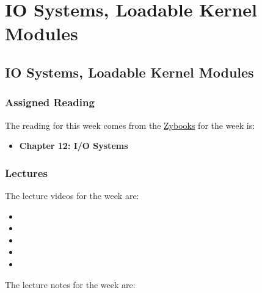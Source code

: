 \clearpage

\renewcommand{\ChapTitle}{IO Systems, Loadable Kernel Modules}
\renewcommand{\SectionTitle}{IO Systems, Loadable Kernel Modules}

\chapter{\ChapTitle}
\section{\SectionTitle}

\subsection{Assigned Reading}

The reading for this week comes from the \href{https://learn.zybooks.com/zybook/COLORADOCSPB3753KnoxFall2024}{Zybooks} for the week is:

\begin{itemize}
    \item \textbf{Chapter 12: I/O Systems}
\end{itemize}

\subsection{Lectures}

The lecture videos for the week are:

\begin{itemize}
    \item {}
    \item {}
    \item {}
    \item {}
    \item {}
\end{itemize}

\noindent The lecture notes for the week are:

